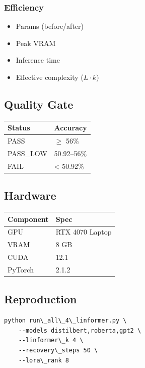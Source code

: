 \subsubsection{Efficiency}
\begin{itemize}
\item Params (before/after)
\item Peak VRAM
\item Inference time
\item Effective complexity ($L \cdot k$)

\end{itemize}
\subsection{Quality Gate}

\begin{table}[H]
\centering
\small
\begin{tabular}{ll}
\toprule
\textbf{Status} & \textbf{Accuracy} \\
\midrule
PASS & $\ge$ 56\% \\
PASS\_LOW & 50.92--56\% \\
FAIL & \textless{} 50.92\% \\
\bottomrule
\end{tabular}
\end{table}

\subsection{Hardware}

\begin{table}[H]
\centering
\small
\begin{tabular}{ll}
\toprule
\textbf{Component} & \textbf{Spec} \\
\midrule
GPU & RTX 4070 Laptop \\
VRAM & 8 GB \\
CUDA & 12.1 \\
PyTorch & 2.1.2 \\
\bottomrule
\end{tabular}
\end{table}

\subsection{Reproduction}

\begin{lstlisting}
python run\_all\_4\_linformer.py \
    --models distilbert,roberta,gpt2 \
    --linformer\_k 4 \
    --recovery\_steps 50 \
    --lora\_rank 8
\end{lstlisting}

